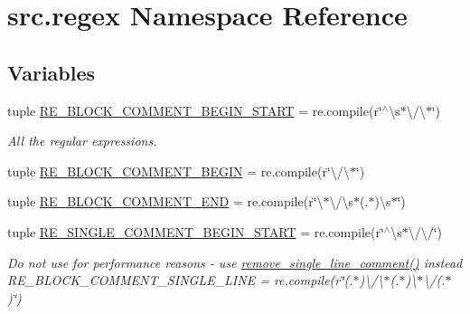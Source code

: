 \hypertarget{namespacesrc_1_1regex}{\section{src.\-regex Namespace Reference}
\label{namespacesrc_1_1regex}
}
\subsection*{Variables}
\begin{DoxyCompactItemize}
\item 
tuple \hyperlink{namespacesrc_1_1regex_a4bbc8eb677d4088a93d907056d718c9a}{R\-E\-\_\-\-B\-L\-O\-C\-K\-\_\-\-C\-O\-M\-M\-E\-N\-T\-\_\-\-B\-E\-G\-I\-N\-\_\-\-S\-T\-A\-R\-T} = re.\-compile(r\char`\"{}$^\wedge$\textbackslash{}s$\ast$\textbackslash{}/\textbackslash{}$\ast$\char`\"{})
\begin{DoxyCompactList}\small\item\em All the regular expressions. \end{DoxyCompactList}\item 
tuple \hyperlink{namespacesrc_1_1regex_a4178334cd19fdaf15bee28a9d4982f78}{R\-E\-\_\-\-B\-L\-O\-C\-K\-\_\-\-C\-O\-M\-M\-E\-N\-T\-\_\-\-B\-E\-G\-I\-N} = re.\-compile(r\char`\"{}\textbackslash{}/\textbackslash{}$\ast$\char`\"{})
\item 
tuple \hyperlink{namespacesrc_1_1regex_a8091f209d3a5b2884407944a5f2fe96b}{R\-E\-\_\-\-B\-L\-O\-C\-K\-\_\-\-C\-O\-M\-M\-E\-N\-T\-\_\-\-E\-N\-D} = re.\-compile(r\char`\"{}\textbackslash{}$\ast$\textbackslash{}/\textbackslash{}s$\ast$(.$\ast$)\textbackslash{}s$\ast$\char`\"{})
\item 
tuple \hyperlink{namespacesrc_1_1regex_a094ab3a7d8b3aa051875b6bc52b9e373}{R\-E\-\_\-\-S\-I\-N\-G\-L\-E\-\_\-\-C\-O\-M\-M\-E\-N\-T\-\_\-\-B\-E\-G\-I\-N\-\_\-\-S\-T\-A\-R\-T} = re.\-compile(r\char`\"{}$^\wedge$\textbackslash{}s$\ast$\textbackslash{}/\textbackslash{}/\char`\"{})
\begin{DoxyCompactList}\small\item\em Do not use for performance reasons -\/ use \hyperlink{namespacesrc_1_1utils_aeb934e59b76906b5837a00557f0ef750}{remove\-\_\-single\-\_\-line\-\_\-comment()} instead R\-E\-\_\-\-B\-L\-O\-C\-K\-\_\-\-C\-O\-M\-M\-E\-N\-T\-\_\-\-S\-I\-N\-G\-L\-E\-\_\-\-L\-I\-N\-E = re.\-compile(r\char`\"{}(.$\ast$)\textbackslash{}/\textbackslash{}$\ast$(.$\ast$)\textbackslash{}$\ast$\textbackslash{}/(.$\ast$)\char`\"{}) \end{DoxyCompactList}\item 

\end{DoxyCompactItemize}
